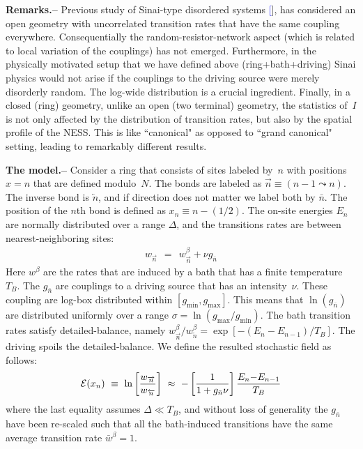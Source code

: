 \documentclass[aps,prl,floats,floatfix,twocolumn]{revtex4}
\newcommand{\mylabel}[1]{\label{#1}}
\newcommand{\beq}{\begin{eqnarray}}
\newcommand{\eeq}{\end{eqnarray}}
\newcommand{\be}[1]{\begin{eqnarray}\ifthenelse{#1=-1}
{\nonumber}{\ifthenelse{#1=0}{}{\mylabel{e#1}}}}
\newcommand{\ee}{\end{eqnarray}}
\newcommand{\sect}[1]{{\bf #1.-- }}
\renewcommand{\cite}[1]{\textcolor{blue}{[\onlinecite{#1}}]} %
\begin{document}
\sect{Remarks}
%
% 
Previous study of Sinai-type disordered systems \cite{sinai2}, 
has considered an open geometry with uncorrelated transition rates 
that have the same coupling everywhere. Consequentially 
the random-resistor-network aspect (which is related to local 
variation of the couplings) has not emerged.
% 
%
Furthermore, in the physically motivated setup that we have 
defined above (ring+bath+driving) Sinai physics would not arise 
if the couplings to the driving source were merely disorderly random. 
The log-wide distribution is a crucial ingredient. 
%
Finally, in a closed (ring) geometry, unlike an open (two terminal) geometry, 
the statistics of~$I$ is not only affected by the distribution of transition rates, 
but also by the spatial profile of the NESS. 
This is like ``canonical" as opposed to ``grand canonical" setting, 
leading to remarkably different results.
 
\clearpage

\sect{The model}
%
%
Consider a ring that consists of sites labeled by~$n$ 
with positions ${x=n}$ that are defined modulo~$N$. 
The bonds are labeled as ${\overrightarrow{n}\equiv(n{-}1 \leadsto n)}$.
The inverse bond is $\overleftarrow{n}$, and if direction does 
not matter we label both by $\bar{n}$. The position of the $n$th bond 
is defined as $x_n \equiv n{-}(1/2)$. The on-site energies $E_n$ 
are normally distributed over a range $\Delta$,  
and the transitions rates are between nearest-neighboring sites:   
%
\beq
w_{\overrightarrow{n}} \ \ = \ \ w^{\beta}_{\overrightarrow{n}} + \nu g_{\bar{n}}
\eeq 
%
Here $w^{\beta}$ are the rates that are induced by a bath that has 
a finite temperature $T_B$. The $g_{\bar{n}}$ are 
couplings to a driving source that has an intensity~$\nu$. 
These coupling are log-box distributed within ${[g_{\text{min}},g_{\text{max}}]}$.
This means that $\ln(g_{\bar{n}})$ are distributed uniformly 
over a range ${\sigma=\ln(g_{\text{max}}/g_{\text{min}})}$. 
%
The bath transition rates satisfy detailed-balance, 
namely $w^{\beta}_{\overrightarrow{n}}/w^{\beta}_{\overleftarrow{n}} = \exp[-(E_{n}{-}E_{n{-}1})/T_B]$.
The driving spoils the detailed-balance. We define the resulted 
stochastic field as follows:
%
\be{100}
\mathcal{E}(x_n) \ \equiv \ \ln \left[\frac{w_{\overrightarrow{n}}}{w_{\overleftarrow{n}}}\right] 
\ \approx \ - \left[ \frac{1}{1+g_{\bar{n}}\nu} \right] \frac{E_n{-}E_{n{-}1}}{T_B}
\ee
%
where the last equality assumes ${\Delta \ll T_B}$,  
and without loss of generality the $g_{\bar{n}}$ have been re-scaled 
such that all the bath-induced transitions have 
the same average transition rate ${\bar{w}^{\beta}=1}$. 
\end{document}
